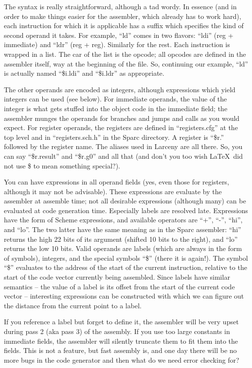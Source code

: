 The syntax is really straightforward, although a tad wordy. In essence (and
in order to make things easier for the assembler, which already has to
work hard), each instruction for which it is applicable has a suffix which
specifies the kind of second operand it takes. For example, ``ld'' comes
in two flavors: ``ldi'' (reg + immediate) and ``ldr'' (reg + reg).
Similarly for the rest. Each instruction is wrapped in a list. The car of
the list is the opcode; all opcodes are defined in the assembler itself,
way at the beginning of the file. So, continuing our example, ``ld'' is
actually named ``\$i.ldi'' and ``\$i.ldr'' as appropriate.

The other operands are encoded as integers, although expressions which yield
integers can be used (see below). For immediate operands, the value of the
integer is what gets stuffed into the object code in the immediate field;
the assembler munges the operands for branches and jumps and calls as you
would expect. For register operands, the registers are defined in
``registers.cfg'' at the top level and in ``registers.sch.h'' in the Sparc
directory. A register is ``\$r.'' followed by the register name. The aliases
used in Larceny are all there. So, you can say ``\$r.result'' and ``\$r.g0''
and all that (and don't you too wish \LaTeX\  did not use \$ to mean something
special?).

You can have expressions in all operand fields (yes, even those for
registers, although it may not be advisable). These expressions are evaluate
by the assembler at assemble time; not all desirable expressions (although
many) can be evaluated at code generation time. Especially labels are
resolved late. Expressions have the form of Scheme expressions, and
available operators are ``+'', ``-'', ``hi'', and ``lo''. The two latter
have the same meaning as in the Sparc assembler: ``hi'' returns the high 22
bits of its argument (shifted 10 bits to the right), and ``lo'' returns the
low 10 bits. Valid operands are labels (which are always in the form of
symbols), integers, and the special symbols ``\$'' (there it is again!).
The symbol ``\$'' evaluates to the address of the start of the current
instruction, relative to the start of the code vector currently being
assembled. Since labels have similar semantics -- the value of a label is
its offset from the start of the current code vector -- interesting
expressions can be constructed with which we can figure out the distance
from the current point to a label.

If you reference a label but forget to define it, the assembler will be very
upset during pass 2 (aka pass 3) of the assembly.  If you use too large
constants in immediate fields, the assembler will silently truncate them to
fit them into the fields. This is not a feature, but fast assembly is, and
one day there will be no more bugs in the code generator and then what do
we need error checking for?

